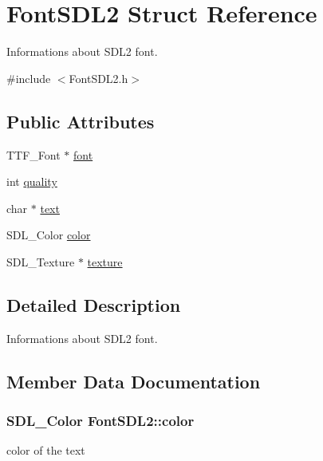 \hypertarget{structFontSDL2}{}\section{Font\+S\+D\+L2 Struct Reference}
\label{structFontSDL2}


Informations about S\+D\+L2 font.  




{\ttfamily \#include $<$Font\+S\+D\+L2.\+h$>$}

\subsection*{Public Attributes}
\begin{DoxyCompactItemize}
\item 
T\+T\+F\+\_\+\+Font $\ast$ \hyperlink{structFontSDL2_a4473d0cf1fe867daeabb4106962d355e}{font}
\item 
int \hyperlink{structFontSDL2_a2aa630dfe74ff80adee30fa5bc62da3f}{quality}
\item 
char $\ast$ \hyperlink{structFontSDL2_a2ebfe0c160217282ef912e1785894c2c}{text}
\item 
S\+D\+L\+\_\+\+Color \hyperlink{structFontSDL2_a8d430ac82b5ffff6c9e6c575328dca22}{color}
\item 
S\+D\+L\+\_\+\+Texture $\ast$ \hyperlink{structFontSDL2_af8f18f11af2195bd21d120426ba89750}{texture}
\end{DoxyCompactItemize}


\subsection{Detailed Description}
Informations about S\+D\+L2 font. 

\subsection{Member Data Documentation}
\subsubsection[{\texorpdfstring{color}{color}}]{\setlength{\rightskip}{0pt plus 5cm}S\+D\+L\+\_\+\+Color Font\+S\+D\+L2\+::color}\hypertarget{structFontSDL2_a8d430ac82b5ffff6c9e6c575328dca22}{}\label{structFontSDL2_a8d430ac82b5ffff6c9e6c575328dca22}
color of the text 
